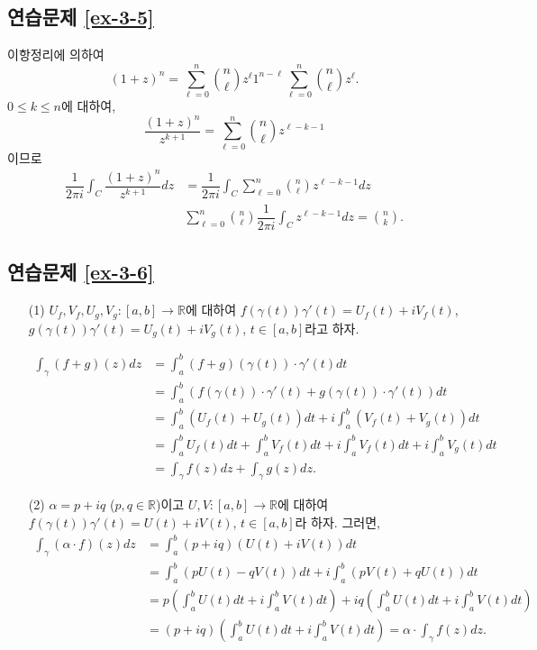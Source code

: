 \subsection*{연습문제 \ref{ex-3-5}}

이항정리에 의하여
\[
(1+z)^n = \sum_{\ell = 0}^n  {n \choose \ell} z^\ell 1^{n-\ell} 
\sum_{\ell = 0}^n  {n \choose \ell} z^\ell.
\]
$0\le k \le n$에 대하여,
\[
\dfrac{(1+z)^n}{z^{k+1}} =\sum_{\ell = 0}^n  {n \choose \ell} z^{\ell-k-1}
\]
이므로
\begin{align*}
\dfrac1{2\pi i} \int_C \dfrac{(1+z)^n}{z^{k+1}}dz
&= \dfrac1{2\pi i} \int_C \sum_{\ell = 0}^n  {n \choose \ell} z^{\ell-k-1} dz \\
&  \sum_{\ell = 0}^n  {n \choose \ell} \dfrac1{2\pi i} \int_C  z^{\ell-k-1}dz
= {n \choose k}.
\end{align*}

\subsection*{연습문제 \ref{ex-3-6}}
\begin{itemize}
\item[(1)]
$U_f, V_f, U_g, V_g:[a,b] \to \mathbb R$에 대하여
$f(\gamma(t))\gamma'(t) = U_f(t) + iV_f(t)$,
$g(\gamma(t))\gamma'(t) = U_g(t) + iV_g(t)$, $t\in[a,b]$라고 하자.

\begin{align*}
\int_\gamma (f+g)(z)dz
&= \int_a^b (f+g)(\gamma(t))\cdot \gamma'(t)dt \\
&= \int_a^b \left( f(\gamma(t))\cdot \gamma'(t) + g(\gamma(t))\cdot \gamma'(t) \right) dt\\
&= \int_a^b (U_f(t) + U_g(t)) dt + i \int_a^b (V_f(t) + V_g(t)) dt \\
&= \int_a^b U_f(t)dt + \int_a^b V_f(t)dt + i\int_a^b V_f(t)dt + i\int_a^b V_g(t)dt \\
&= \int_\gamma f(z)dz + \int_\gamma g(z)dz.
\end{align*}

\item[(2)] $\alpha = p+iq$ ($p,q\in\mathbb R$)이고
$U,V:  [a,b] \to \mathbb R$에 대하여
$f(\gamma(t))\gamma'(t)  = U(t) + iV(t)$, $t\in[a,b]$라 하자.
그러면,
\begin{align*}
\int_\gamma (\alpha\cdot f)(z) dz
&= \int_a^b (p+iq)(U(t) + iV(t))dt \\
&= \int_a^b(pU(t) - qV(t))dt + i\int_a^b (pV(t) + qU(t))dt \\
&= p \left(\int_a^b U(t)dt + i \int_a^b V(t)dt \right)
+ iq\left(\int_a^b U(t)dt + i \int_a^b V(t)dt \right) \\
&= (p+iq)\left(\int_a^b U(t)dt + i \int_a^b V(t)dt \right)
= \alpha \cdot \int_\gamma f(z)dz.
\end{align*}
\end{itemize}

